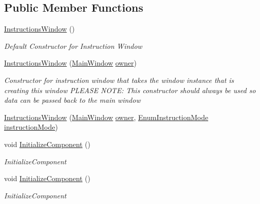 \subsection*{Public Member Functions}
\begin{DoxyCompactItemize}
\item 
\hyperlink{class_c_p_u___o_s___simulator_1_1_instructions_window_aa482ef12f9c98458bedcc3c07d696879}{Instructions\+Window} ()
\begin{DoxyCompactList}\small\item\em Default Constructor for Instruction Window \end{DoxyCompactList}\item 
\hyperlink{class_c_p_u___o_s___simulator_1_1_instructions_window_a5ed238dc308dcc976400105a3973deb0}{Instructions\+Window} (\hyperlink{class_c_p_u___o_s___simulator_1_1_main_window}{Main\+Window} \hyperlink{class_c_p_u___o_s___simulator_1_1_instructions_window_a954c950c677c61a3b7ed7406b6dc7164}{owner})
\begin{DoxyCompactList}\small\item\em Constructor for instruction window that takes the window instance that is creating this window P\+L\+E\+A\+S\+E N\+O\+T\+E\+: This constructor should always be used so data can be passed back to the main window \end{DoxyCompactList}\item 
\hyperlink{class_c_p_u___o_s___simulator_1_1_instructions_window_afa6f0e58a20268fa56006a775c7959e4}{Instructions\+Window} (\hyperlink{class_c_p_u___o_s___simulator_1_1_main_window}{Main\+Window} \hyperlink{class_c_p_u___o_s___simulator_1_1_instructions_window_a954c950c677c61a3b7ed7406b6dc7164}{owner}, \hyperlink{namespace_c_p_u___o_s___simulator_adc17a5a5e004084f05dc8e4d3f70e31f}{Enum\+Instruction\+Mode} \hyperlink{class_c_p_u___o_s___simulator_1_1_instructions_window_aae7addf8e362e26e981b36b9940a53c0}{instruction\+Mode})
\item 
void \hyperlink{class_c_p_u___o_s___simulator_1_1_instructions_window_a8ad79899f3d5210d66fb5973b721895a}{Initialize\+Component} ()
\begin{DoxyCompactList}\small\item\em Initialize\+Component \end{DoxyCompactList}\item 
void \hyperlink{class_c_p_u___o_s___simulator_1_1_instructions_window_a8ad79899f3d5210d66fb5973b721895a}{Initialize\+Component} ()
\begin{DoxyCompactList}\small\item\em Initialize\+Component \end{DoxyCompactList}\item 

\end{DoxyCompactItemize}
